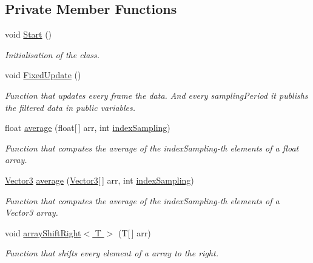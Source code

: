 \subsection*{Private Member Functions}
\begin{DoxyCompactItemize}
\item 
void \hyperlink{classmonitoring_a4aa220d0178d2b204e8039855c412c30}{Start} ()
\begin{DoxyCompactList}\small\item\em Initialisation of the class. \end{DoxyCompactList}\item 
void \hyperlink{classmonitoring_a257af7f7bd0d01b91dc5d34f85743b5f}{Fixed\+Update} ()
\begin{DoxyCompactList}\small\item\em Function that updates every frame the data. And every \textquotesingle{}sampling\+Period\textquotesingle{} it publishs the filtered data in public variables. \end{DoxyCompactList}\item 
float \hyperlink{classmonitoring_a02b9ad38b7160a01547d1540d3ced5a2}{average} (float\mbox{[}$\,$\mbox{]} arr, int \hyperlink{classmonitoring_a6f24f8f72c806c9afab0e3de87636a27}{index\+Sampling})
\begin{DoxyCompactList}\small\item\em Function that computes the average of the {\ttfamily index\+Sampling}-\/th elements of a float array. \end{DoxyCompactList}\item 
\hyperlink{classmonitoring_a4a225f8529921b2f6b38156cf3b296cf}{Vector3} \hyperlink{classmonitoring_a8b3badd3272bcdef5a3f438db1dbde7f}{average} (\hyperlink{classmonitoring_a4a225f8529921b2f6b38156cf3b296cf}{Vector3}\mbox{[}$\,$\mbox{]} arr, int \hyperlink{classmonitoring_a6f24f8f72c806c9afab0e3de87636a27}{index\+Sampling})
\begin{DoxyCompactList}\small\item\em Function that computes the average of the {\ttfamily index\+Sampling}-\/th elements of a {\ttfamily Vector3} array. \end{DoxyCompactList}\item 
void \hyperlink{classmonitoring_af09a1f1c17d9523758c57e7808afc81d}{array\+Shift\+Right$<$ T $>$} (T\mbox{[}$\,$\mbox{]} arr)
\begin{DoxyCompactList}\small\item\em Function that shifts every element of a array to the right. \end{DoxyCompactList}\end{DoxyCompactItemize}
